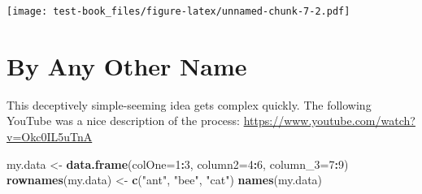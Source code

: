 \documentclass[]{book}
\newenvironment{Shaded}{\begin{snugshade}}{\end{snugshade}}
\newcommand{\CommentTok}[1]{\textcolor[rgb]{0.56,0.35,0.01}{\textit{#1}}}
\newcommand{\DataTypeTok}[1]{\textcolor[rgb]{0.13,0.29,0.53}{#1}}
\newcommand{\DecValTok}[1]{\textcolor[rgb]{0.00,0.00,0.81}{#1}}
\newcommand{\KeywordTok}[1]{\textcolor[rgb]{0.13,0.29,0.53}{\textbf{#1}}}
\newcommand{\NormalTok}[1]{#1}
\newcommand{\OperatorTok}[1]{\textcolor[rgb]{0.81,0.36,0.00}{\textbf{#1}}}
\newcommand{\StringTok}[1]{\textcolor[rgb]{0.31,0.60,0.02}{#1}}
\begin{document}
\begin{Shaded}
\end{Shaded}

\texttt{[image: test-book\_files/figure-latex/unnamed-chunk-7-2.pdf]}

\hypertarget{changenames}{%
\chapter{By Any Other Name}\label{changenames}}

This deceptively simple-seeming idea gets complex quickly. The following YouTube was a nice description of the process: \url{https://www.youtube.com/watch?v=Okc0IL5uTnA}

\begin{Shaded}
\begin{Highlighting}[]
\NormalTok{my.data <-}\StringTok{ }\KeywordTok{data.frame}\NormalTok{(}\DataTypeTok{colOne=}\DecValTok{1}\OperatorTok{:}\DecValTok{3}\NormalTok{, }\DataTypeTok{column2=}\DecValTok{4}\OperatorTok{:}\DecValTok{6}\NormalTok{, }\DataTypeTok{column_3=}\DecValTok{7}\OperatorTok{:}\DecValTok{9}\NormalTok{)}
\KeywordTok{rownames}\NormalTok{(my.data) <-}\StringTok{ }\KeywordTok{c}\NormalTok{(}\StringTok{"ant"}\NormalTok{, }\StringTok{"bee"}\NormalTok{, }\StringTok{"cat"}\NormalTok{)}
\KeywordTok{names}\NormalTok{(my.data)}
\end{Highlighting}
\end{Shaded}
\end{document}
